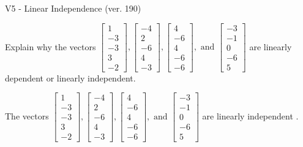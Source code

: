 \begin{exercise}
  \begin{exerciseTitle}V5 - Linear Independence (ver. 190)\end{exerciseTitle}
  \begin{exerciseStatement}
    Explain why the vectors \(\left[\begin{array}{r}
1 \\
-3 \\
-3 \\
3 \\
-2
\end{array}\right] , \left[\begin{array}{r}
-4 \\
2 \\
-6 \\
4 \\
-3
\end{array}\right] , \left[\begin{array}{r}
4 \\
-6 \\
4 \\
-6 \\
-6
\end{array}\right] , \text{ and } \left[\begin{array}{r}
-3 \\
-1 \\
0 \\
-6 \\
5
\end{array}\right]\) are linearly dependent or linearly independent.	


  \end{exerciseStatement}
  \begin{exerciseAnswer}
   The vectors \(\left[\begin{array}{r}
1 \\
-3 \\
-3 \\
3 \\
-2
\end{array}\right] , \left[\begin{array}{r}
-4 \\
2 \\
-6 \\
4 \\
-3
\end{array}\right] , \left[\begin{array}{r}
4 \\
-6 \\
4 \\
-6 \\
-6
\end{array}\right] , \text{ and } \left[\begin{array}{r}
-3 \\
-1 \\
0 \\
-6 \\
5
\end{array}\right]\) are 
  	 linearly independent  .
  


  \end{exerciseAnswer}
\end{exercise}